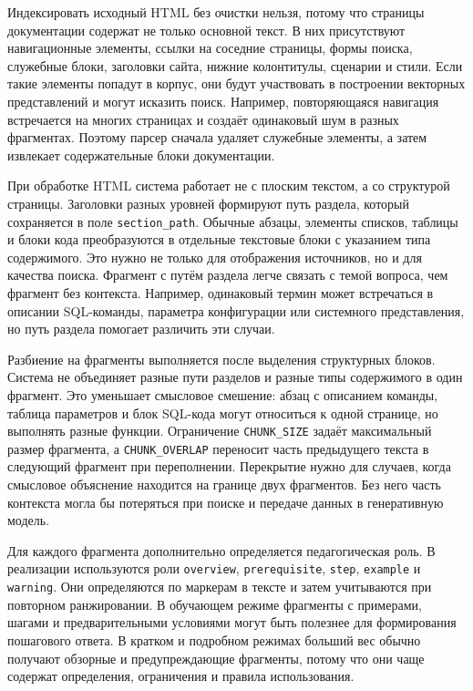 Индексировать исходный HTML без очистки нельзя, потому что страницы документации содержат не только основной текст. В них присутствуют навигационные элементы, ссылки на соседние страницы, формы поиска, служебные блоки, заголовки сайта, нижние колонтитулы, сценарии и стили. Если такие элементы попадут в корпус, они будут участвовать в построении векторных представлений и могут исказить поиск. Например, повторяющаяся навигация встречается на многих страницах и создаёт одинаковый шум в разных фрагментах. Поэтому парсер сначала удаляет служебные элементы, а затем извлекает содержательные блоки документации.

При обработке HTML система работает не с плоским текстом, а со структурой страницы. Заголовки разных уровней формируют путь раздела, который сохраняется в поле \texttt{section\_path}. Обычные абзацы, элементы списков, таблицы и блоки кода преобразуются в отдельные текстовые блоки с указанием типа содержимого. Это нужно не только для отображения источников, но и для качества поиска. Фрагмент с путём раздела легче связать с темой вопроса, чем фрагмент без контекста. Например, одинаковый термин может встречаться в описании SQL-команды, параметра конфигурации или системного представления, но путь раздела помогает различить эти случаи.

Разбиение на фрагменты выполняется после выделения структурных блоков. Система не объединяет разные пути разделов и разные типы содержимого в один фрагмент. Это уменьшает смысловое смешение: абзац с описанием команды, таблица параметров и блок SQL-кода могут относиться к одной странице, но выполнять разные функции. Ограничение \texttt{CHUNK\_SIZE} задаёт максимальный размер фрагмента, а \texttt{CHUNK\_OVERLAP} переносит часть предыдущего текста в следующий фрагмент при переполнении. Перекрытие нужно для случаев, когда смысловое объяснение находится на границе двух фрагментов. Без него часть контекста могла бы потеряться при поиске и передаче данных в генеративную модель.

Для каждого фрагмента дополнительно определяется педагогическая роль. В реализации используются роли \texttt{overview}, \texttt{prerequisite}, \texttt{step}, \texttt{example} и \texttt{warning}. Они определяются по маркерам в тексте и затем учитываются при повторном ранжировании. В обучающем режиме фрагменты с примерами, шагами и предварительными условиями могут быть полезнее для формирования пошагового ответа. В кратком и подробном режимах больший вес обычно получают обзорные и предупреждающие фрагменты, потому что они чаще содержат определения, ограничения и правила использования.

